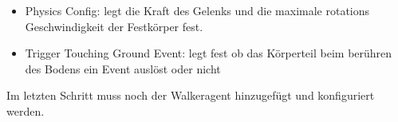 \begin{itemize}
  \item Physics Config: legt die Kraft des Gelenks und die maximale rotations Geschwindigkeit der Festkörper fest.
  \item Trigger Touching Ground Event: legt fest ob das Körperteil beim berühren des Bodens ein Event auslöst oder nicht
\end{itemize}

Im letzten Schritt muss noch der Walkeragent hinzugefügt und konfiguriert werden.